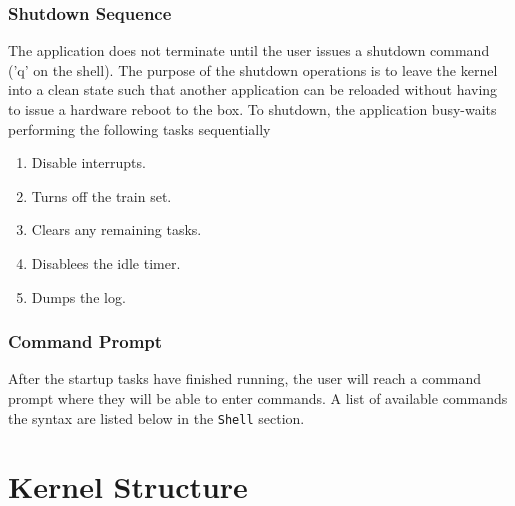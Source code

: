 \documentclass[12pt]{article}
\begin{document}
\subsubsection{Shutdown Sequence}
The application does not terminate until the user issues a shutdown command ('q' on the shell).  The purpose of the shutdown operations is to leave the kernel into a clean state such that another application can be reloaded without having to issue a hardware reboot to the box.  To shutdown, the application busy-waits performing the following tasks sequentially
\begin{enumerate}[label={\bf \arabic*.}, leftmargin=1cm]
  \item Disable interrupts.
  \item Turns off the train set.
  \item Clears any remaining tasks.
  \item Disablees the idle timer.
  \item Dumps the log.
    \\[1\baselineskip]
\end{enumerate}
\subsubsection{Command Prompt}
After the startup tasks have finished running, the user will reach a command prompt where they will be able to enter commands.  A list of available commands the syntax are listed below in the \texttt{Shell} section.
\\[2\baselineskip]

\section{Kernel Structure}
\end{document}
